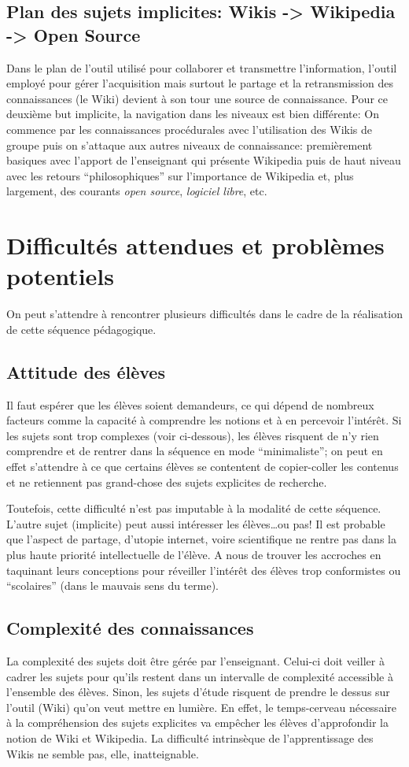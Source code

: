 \documentclass[11pt,bibliography=totoc]{scrartcl}
\begin{document}
\subsection{Plan des sujets implicites: Wikis -> Wikipedia -> Open Source}
Dans le plan de l'outil utilisé pour collaborer et transmettre l'information,
l'outil employé pour gérer l'acquisition mais surtout le partage et la
retransmission des connaissances (le Wiki) devient à son tour une source de
connaissance.  Pour ce deuxième but implicite, la navigation dans les niveaux est
bien différente: On commence par les connaissances procédurales avec
l'utilisation des Wikis de groupe puis on s'attaque aux autres niveaux de
connaissance: premièrement basiques avec l'apport de l'enseignant qui présente
Wikipedia puis de haut niveau avec les retours ``philosophiques'' sur
l'importance de Wikipedia et, plus largement, des courants \textit{open source},
\textit{logiciel libre}, etc.

\section{Difficultés attendues et problèmes potentiels}
On peut s'attendre à rencontrer plusieurs difficultés dans le cadre de la
réalisation de cette séquence pédagogique.

\subsection{Attitude des élèves}
Il faut espérer que les élèves soient demandeurs, ce qui dépend de nombreux
facteurs comme la capacité à comprendre les notions et à en percevoir
l'intérêt. Si les sujets sont trop complexes (voir ci-dessous), les élèves
risquent de n'y rien comprendre et de rentrer dans la séquence en mode
``minimaliste''; on peut en effet s'attendre à ce que certains élèves se
contentent de copier-coller les contenus et ne retiennent pas grand-chose des
sujets explicites de recherche.

Toutefois, cette difficulté n'est pas imputable à la modalité de cette séquence.
L'autre sujet (implicite) peut aussi intéresser les élèves\ldots ou pas! Il est
probable que l'aspect de partage, d'utopie internet, voire scientifique ne
rentre pas dans la plus haute priorité intellectuelle de l'élève. A nous de
trouver les accroches en taquinant leurs conceptions pour réveiller l'intérêt
des élèves trop conformistes ou ``scolaires'' (dans le mauvais sens du terme).

\subsection{Complexité des connaissances}
La complexité des sujets doit être gérée par l'enseignant. Celui-ci doit veiller
à cadrer les sujets pour qu'ils restent dans un intervalle de complexité
accessible à l'ensemble des élèves. Sinon, les sujets d'étude risquent de
prendre le dessus sur l'outil (Wiki) qu'on veut mettre en lumière. En effet, le
temps-cerveau nécessaire à la compréhension des sujets explicites va empêcher
les élèves d'approfondir la notion de Wiki et Wikipedia.  La difficulté
intrinsèque de l'apprentissage des Wikis ne semble pas, elle, inatteignable.
\end{document}
